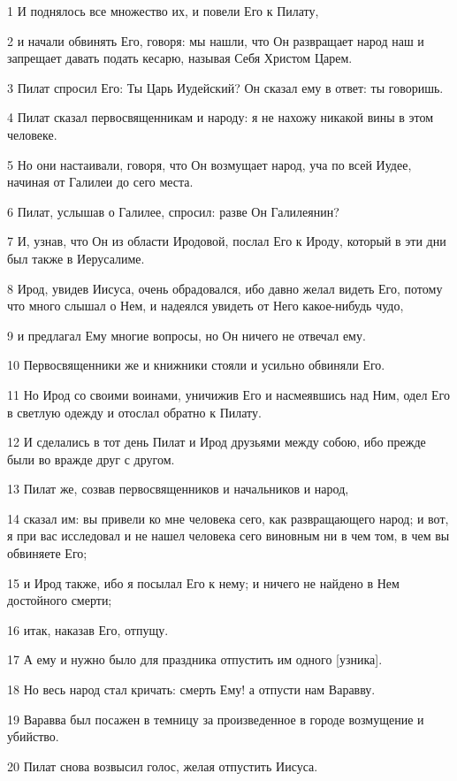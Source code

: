 \par 1 И поднялось все множество их, и повели Его к Пилату,
\par 2 и начали обвинять Его, говоря: мы нашли, что Он развращает народ наш и запрещает давать подать кесарю, называя Себя Христом Царем.
\par 3 Пилат спросил Его: Ты Царь Иудейский? Он сказал ему в ответ: ты говоришь.
\par 4 Пилат сказал первосвященникам и народу: я не нахожу никакой вины в этом человеке.
\par 5 Но они настаивали, говоря, что Он возмущает народ, уча по всей Иудее, начиная от Галилеи до сего места.
\par 6 Пилат, услышав о Галилее, спросил: разве Он Галилеянин?
\par 7 И, узнав, что Он из области Иродовой, послал Его к Ироду, который в эти дни был также в Иерусалиме.
\par 8 Ирод, увидев Иисуса, очень обрадовался, ибо давно желал видеть Его, потому что много слышал о Нем, и надеялся увидеть от Него какое-нибудь чудо,
\par 9 и предлагал Ему многие вопросы, но Он ничего не отвечал ему.
\par 10 Первосвященники же и книжники стояли и усильно обвиняли Его.
\par 11 Но Ирод со своими воинами, уничижив Его и насмеявшись над Ним, одел Его в светлую одежду и отослал обратно к Пилату.
\par 12 И сделались в тот день Пилат и Ирод друзьями между собою, ибо прежде были во вражде друг с другом.
\par 13 Пилат же, созвав первосвященников и начальников и народ,
\par 14 сказал им: вы привели ко мне человека сего, как развращающего народ; и вот, я при вас исследовал и не нашел человека сего виновным ни в чем том, в чем вы обвиняете Его;
\par 15 и Ирод также, ибо я посылал Его к нему; и ничего не найдено в Нем достойного смерти;
\par 16 итак, наказав Его, отпущу.
\par 17 А ему и нужно было для праздника отпустить им одного [узника].
\par 18 Но весь народ стал кричать: смерть Ему! а отпусти нам Варавву.
\par 19 Варавва был посажен в темницу за произведенное в городе возмущение и убийство.
\par 20 Пилат снова возвысил голос, желая отпустить Иисуса.

